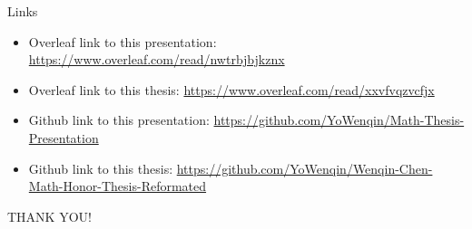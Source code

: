 \documentclass[handout, 10 pt]{beamer}
\begin{document}



\begin{frame}{Links}
\begin{itemize}
    \item Overleaf link to this presentation: \href{https://www.overleaf.com/read/nwtrbjbjkznx}{https://www.overleaf.com/read/nwtrbjbjkznx}
    \item Overleaf link to this thesis:
    \href{https://www.overleaf.com/read/xxvfvqzvcfjx}{https://www.overleaf.com/read/xxvfvqzvcfjx}
    \item Github link to this presentation:
    \href{https://github.com/YoWenqin/Math-Thesis-Presentation}{https://github.com/YoWenqin/Math-Thesis-Presentation}
    \item Github link to this thesis:
    \href{https://github.com/YoWenqin/Wenqin-Chen-Math-Honor-Thesis-Reformated}{https://github.com/YoWenqin/Wenqin-Chen-Math-Honor-Thesis-Reformated}
    
\end{itemize}
\end{frame}

\begin{frame}


\begin{center}
\huge{THANK YOU!}

\end{center}

\end{frame}

















\end{document}
